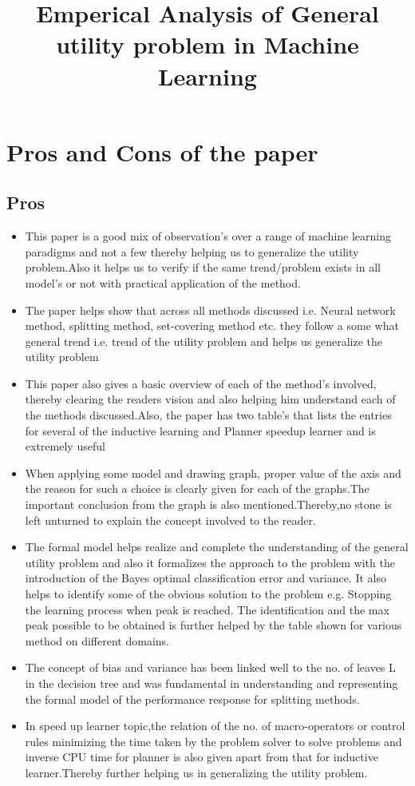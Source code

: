 \documentclass{bmvc2k}
\title{Emperical Analysis of General utility problem in Machine Learning}
\begin{document}
\maketitle

\section{Pros and Cons of the paper}
\label{sec:intro}
\subsection{Pros}
\begin{itemize}
\item
This paper is a good mix of observation’s over a range of machine learning paradigms and not a few thereby helping us to generalize the utility problem.Also it helps us to verify if the same trend/problem exists in all model’s or not with practical application of the method.
\item
The paper helps show that across all methods discussed i.e. Neural network method, splitting method, set-covering method etc. they follow a some what general trend i.e. trend of the utility problem and helps us generalize the utility problem
\item
This paper also gives a basic overview of each of the method’s involved, thereby clearing the readers vision and also helping him understand each of the methods discussed.Also, the paper has two table's that lists the  entries for several of the inductive learning and Planner speedup learner  and is extremely useful 
\item
When applying some model and drawing graph, proper value of the axis and the reason for such a choice is clearly given for each of the graphs.The important conclusion from the graph is also mentioned.Thereby,no stone is left unturned to explain the concept involved to the reader.
\item
The formal model helps realize and complete the understanding of the general utility problem and also it formalizes the approach to the problem with the introduction of the Bayes optimal classification error and variance. It also helps to identify some of the obvious solution to the problem e.g. Stopping the learning process when peak is reached. The identification and the max peak possible to be obtained is further helped by the table shown for various method on different domains.

\item
The concept of bias and variance has been linked well to the no. of leaves L in the decision tree and was fundamental in understanding and representing the 
 formal model of the performance response for splitting methods.
 \item 
 In speed up learner topic,the relation of the no. of macro-operators or control rules minimizing the time taken by the problem solver to solve problems and inverse CPU time for planner is also given apart from that for inductive learner.Thereby further helping us in generalizing the utility problem.
\end{itemize}
\end{document}
